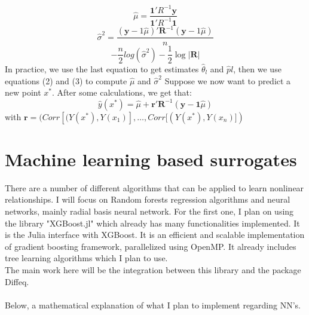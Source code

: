 \documentclass[11pt,a4paper,oneside,titlepage,openright]{book}
\begin{document}
\begin{equation}
\hat \mu = \frac{\mathbf{1}' R^{-1}\mathbf{y}}{\mathbf{1}' R^{-1}\mathbf{1}} 
\end{equation} 
\begin{equation}
\hat \sigma^2 = \frac{(\mathbf{y}-1\hat \mu)'\mathbf{R}^{-1}(\mathbf{y}-1\hat \mu)}{n} 
\end{equation} 
\begin{equation}
-\frac{n}{2}log(\hat \sigma^2) -\frac{1}{2}\log{\vert \mathbf{R} \vert}
\end{equation}
In practice, we use the last equation to get estimates  $\hat \theta_l$ and $\hat pl$, then we use equations (2) and (3) to compute $\hat \mu$ and $\hat \sigma^2$
Suppose we now want to predict a new point $x^*$. After some calculations, we get that: 
\begin{equation}
\hat y(x^*) = \hat \mu + \mathbf{r}' \mathbf{R}^{-1}(\mathbf{y} - \mathbf{1}\hat \mu)
\end{equation}
with $\mathbf{r} = (Corr[(Y(x^*),Y(x_1)], \ldots,Corr[(Y(x^*),Y(x_n)])$



\section*{Machine learning based surrogates}
There are a number of different algorithms that can be applied to learn nonlinear relationships. I will focus on Random forests regression algorithms and neural networks, mainly radial basis neural network. 
For the first one, I plan on using the library "XGBoost.jl" which already has many functionalities implemented. It is the Julia interface with  XGBoost.  It is an efficient and scalable implementation of gradient boosting framework, parallelized using OpenMP. 
It already includes tree learning algorithms which I plan to use.\\
The main work here will be the integration between this library and the package Diffeq.\\\\
Below, a mathematical explanation of what I plan to implement regarding NN's.
\end{document}
